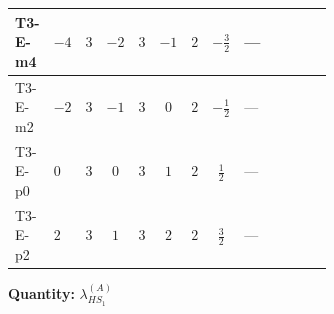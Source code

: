 \documentclass[8pt]{article}
\begin{document}
\begin{landscape}
\begin{longtable}{@{}llcccccc >{\raggedright\arraybackslash}p{0.21\linewidth} >{\raggedright\arraybackslash}p{0.21\linewidth} >{\raggedright\arraybackslash}p{0.21\linewidth}@{}}
\midrule
T3-E-m4 & $-4$ & $3$ & $-2$ & $3$ & $-1$ & $2$ & $-\frac{3}{2}$ & --- & \scriptsize\adjustbox{max width=\linewidth}{$\begin{gathered} -\frac{4}{3} \operatorname{Tr}\!\left({y_1}\,\left({y_1}\right)^{\dagger}\,{Y_e}\,\left({Y_e}\right)^{\dagger}\right)\end{gathered}$} & \scriptsize\adjustbox{max width=\linewidth}{$\begin{gathered} -\frac{4}{3} {\lambda_5} \left({\lambda_5}\right)^{*}\end{gathered}$} \\
\midrule
T3-E-m2 & $-2$ & $3$ & $-1$ & $3$ & $0$ & $2$ & $-\frac{1}{2}$ & --- & \scriptsize\adjustbox{max width=\linewidth}{$\begin{gathered} -\frac{4}{3} \operatorname{Tr}\!\left({y_1}\,\left({y_1}\right)^{\dagger}\,{Y_e}\,\left({Y_e}\right)^{\dagger}\right)\end{gathered}$} & \scriptsize\adjustbox{max width=\linewidth}{$\begin{gathered} -\frac{4}{3} {\lambda_5} \left({\lambda_5}\right)^{*}\end{gathered}$} \\
\midrule
T3-E-p0 & $0$ & $3$ & $0$ & $3$ & $1$ & $2$ & $\frac{1}{2}$ & --- & \scriptsize\adjustbox{max width=\linewidth}{$\begin{gathered} -\frac{4}{3} \operatorname{Tr}\!\left({y_1}\,\left({y_1}\right)^{\dagger}\,{Y_e}\,\left({Y_e}\right)^{\dagger}\right)\end{gathered}$} & \scriptsize\adjustbox{max width=\linewidth}{$\begin{gathered} -\frac{4}{3} {\lambda_5} \left({\lambda_5}\right)^{*}\end{gathered}$} \\
\midrule
T3-E-p2 & $2$ & $3$ & $1$ & $3$ & $2$ & $2$ & $\frac{3}{2}$ & --- & \scriptsize\adjustbox{max width=\linewidth}{$\begin{gathered} -\frac{4}{3} \operatorname{Tr}\!\left({y_1}\,\left({y_1}\right)^{\dagger}\,{Y_e}\,\left({Y_e}\right)^{\dagger}\right)\end{gathered}$} & \scriptsize\adjustbox{max width=\linewidth}{$\begin{gathered} -\frac{4}{3} {\lambda_5} \left({\lambda_5}\right)^{*}\end{gathered}$} \\
\midrule
\bottomrule
\end{longtable}
\clearpage
\noindent\textbf{Quantity: }$\lambda_{HS_1}^{(A)}$\par\smallskip

\end{landscape}
\end{document}
